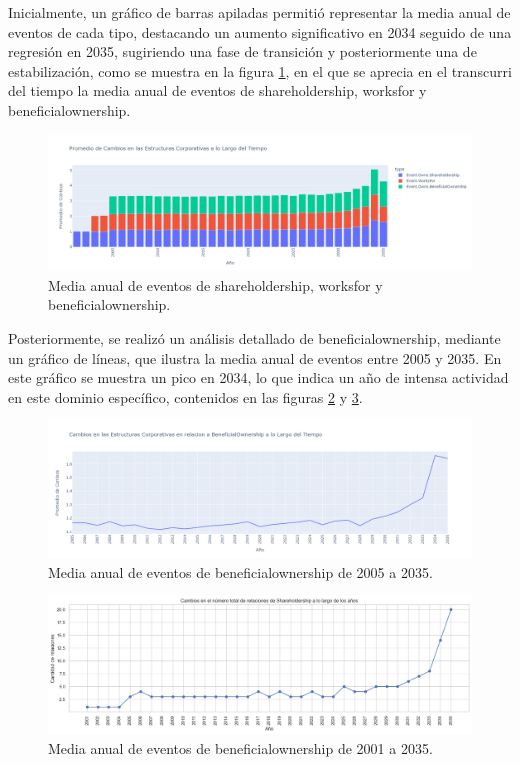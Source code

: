 \documentclass[11pt,spanish,a4paper]{article}
\begin{document}
Inicialmente, un gráfico de barras apiladas permitió representar la media anual de eventos de cada tipo, destacando un aumento significativo en 2034 seguido de una regresión en 2035, sugiriendo una fase de transición y posteriormente una de estabilización, como se muestra en la figura \ref{fig:medias_eventos}, en el que se aprecia en el transcurri del tiempo la media anual de eventos  de shareholdership, worksfor y beneficialownership.

\begin{figure}[H]
  \centering
  \includegraphics[width=0.7\linewidth]{graphs/promedio_cambio_estructuras.png}
  \caption{Media anual de eventos de shareholdership, worksfor y beneficialownership.}
  \label{fig:medias_eventos}
\end{figure}

Posteriormente, se realizó un análisis detallado de beneficialownership, mediante un gráfico de líneas, que ilustra la media anual de eventos entre 2005 y 2035. En este gráfico se muestra un pico en 2034, lo que indica un año de intensa actividad en este dominio específico, contenidos en las figuras \ref{fig:beneficial_ownership_2005_2035} y \ref{fig:sharedholdership_top_anio}.

\begin{figure}[H]
  \centering
  \includegraphics[width=0.7\linewidth]{graphs/promedio_cambio_beneficialOwnership.png}
  \caption{Media anual de eventos de beneficialownership de 2005 a 2035.}
  \label{fig:beneficial_ownership_2005_2035}
\end{figure}

\begin{figure}[H]
  \centering
  \includegraphics[width=0.7\linewidth]{graphs/dispersion_sharedholdership_top_anio_v2.png}
  \caption{Media anual de eventos de beneficialownership de 2001 a 2035.}
  \label{fig:sharedholdership_top_anio}
\end{figure}
\end{document}
